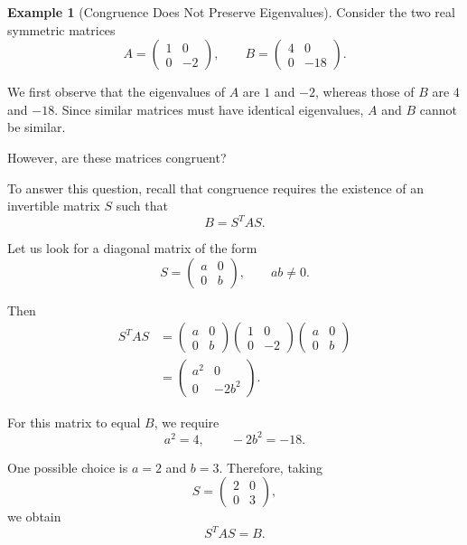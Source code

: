 \documentclass[11pt]{article}
\theoremstyle{definition}
\newtheorem{example}[theorem]{Example}
\theoremstyle{remark}
\begin{document}
\begin{example}[Congruence Does Not Preserve Eigenvalues]

Consider the two real symmetric matrices
\[
    A=
    \begin{pmatrix}
        1&0\\
        0&-2
    \end{pmatrix},
    \qquad
    B=
    \begin{pmatrix}
        4&0\\
        0&-18
    \end{pmatrix}.
\]

We first observe that the eigenvalues of $A$ are
$1$ and $-2$, whereas those of $B$ are $4$ and
$-18$. Since similar matrices must have identical
eigenvalues, $A$ and $B$ cannot be similar.

However, are these matrices congruent?

To answer this question, recall that congruence
requires the existence of an invertible matrix
$S$ such that
\[
    B=S^TAS.
\]

Let us look for a diagonal matrix of the form
\[
    S=
    \begin{pmatrix}
        a&0\\
        0&b
    \end{pmatrix},
    \qquad ab\neq 0.
\]

Then
\[
\begin{aligned}
    S^TAS
    &=
    \begin{pmatrix}
        a&0\\
        0&b
    \end{pmatrix}
    \begin{pmatrix}
        1&0\\
        0&-2
    \end{pmatrix}
    \begin{pmatrix}
        a&0\\
        0&b
    \end{pmatrix}\\
    &=
    \begin{pmatrix}
        a^2&0\\
        0&-2b^2
    \end{pmatrix}.
\end{aligned}
\]

For this matrix to equal $B$, we require
\[
    a^2=4,
    \qquad
    -2b^2=-18.
\]

One possible choice is $a=2$ and $b=3$.
Therefore, taking
\[
    S=
    \begin{pmatrix}
        2&0\\
        0&3
    \end{pmatrix},
\]
we obtain
\[
    \boxed{S^TAS=B}.
\]


\end{example}
\end{document}
